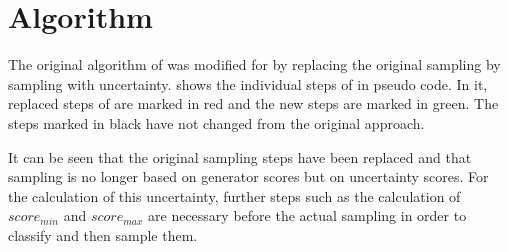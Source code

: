 \section{Algorithm}
\label{sec:algorithm}

The original algorithm of \kbgan was modified for \ucgan by replacing the original sampling by sampling with uncertainty.
 shows the individual steps of \kbgan in pseudo code.
In it, replaced steps of \kbgan are marked in red and the new steps are marked in green.
The steps marked in black have not changed from the original approach.

It can be seen that the original sampling steps have been replaced and that sampling is no longer based on generator scores but on uncertainty scores.
For the calculation of this uncertainty, further steps such as the calculation of $score_{min}$ and $score_{max}$ are necessary before the actual sampling in order to classify and then sample them.